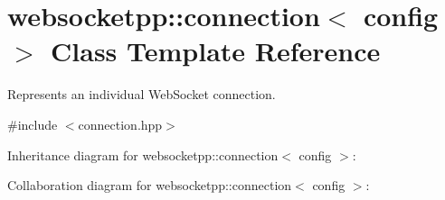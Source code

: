\hypertarget{classwebsocketpp_1_1connection}{}\section{websocketpp\+:\+:connection$<$ config $>$ Class Template Reference}
\label{classwebsocketpp_1_1connection}


Represents an individual Web\+Socket connection.  




{\ttfamily \#include $<$connection.\+hpp$>$}



Inheritance diagram for websocketpp\+:\+:connection$<$ config $>$\+:


Collaboration diagram for websocketpp\+:\+:connection$<$ config $>$\+:
